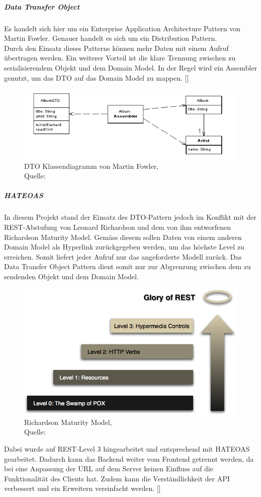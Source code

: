 \subparagraph{Data Transfer Object}\label{DTO}
Es handelt sich hier um ein Enterprise Application Architecture Pattern von Martin Fowler. Genauer handelt es sich um ein Distribution Pattern. \\
Durch den Einsatz dieses Patterns können mehr Daten mit einem Aufruf übertragen werden. Ein weiterer Vorteil ist die klare Trennung zwischen zu serialisierendem Objekt und dem Domain Model. In der Regel wird ein Assembler genutzt, um das DTO auf das Domain Model zu mappen. [\cite{dtoFowler}]
\begin{figure}[H]
	\centering
	\includegraphics[width=1\textwidth]{images/dtoSketch.png}
	\caption[DTO Klassendiagramm von Martin Fowler]{DTO Klassendiagramm von Martin Fowler,\\ Quelle: \cite{dtoFowler}}
	\label{img: dtoFowler}
\end{figure}
\subparagraph{\ac{HATEOAS}}
In diesem Projekt stand der Einsatz des DTO-Pattern jedoch im Konflikt mit der REST-Abstufung von Leonard Richardson und dem von ihm entworfenen Richardson Maturity Model. Gemäss diesem sollen Daten von einem anderen Domain Model als Hyperlink zurückgegeben werden, um das höchste Level zu erreichen. Somit liefert jeder Aufruf nur das angeforderte Modell zurück. Das Data Transfer Object Pattern dient somit nur zur Abgrenzung zwischen dem zu sendenden Objekt und dem Domain Model. 

\begin{figure}[H]
	\centering
	\includegraphics[scale=0.3]{images/richardsonMaturity.png}
	\caption[Richardson Maturity Model]{Richardson Maturity Model,\\ Quelle: \cite{richardsonMaturity}}
	\label{img: richardsonMaturity}
\end{figure}
Dabei wurde auf REST-Level 3 hingearbeitet und entsprechend mit HATEOAS gearbeitet. Dadurch kann das Backend weiter vom Frontend getrennt werden, da bei eine Anpassung der URL auf dem Server keinen Einfluss auf die Funktionalität des Clients hat. Zudem kann die Verständlichkeit der API verbessert und ein Erweitern vereinfacht werden. [\cite{richardsonMaturity}]
